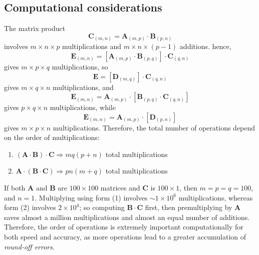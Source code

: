 \subsection{Computational considerations}
The matrix product
\begin{equation}
\mathbf{C}_{(m,n)} = \mathbf{A}_{(m,p)} \cdot \mathbf{B}_{(p,n)}
\end{equation}
involves $m \times n \times p$ multiplications and $m \times n  \times (p -1)$ additions.  hence,
\begin{equation}
\mathbf{E}_{(m,n)} = [ \mathbf{A}_{(m,p)} \cdot \mathbf{B}_{(p,q)}] \cdot \mathbf{C}_{(q,n)}
\end{equation}	 
gives $m \times p \times q$ multiplications, so
\begin{equation}
\mathbf{E} = [\mathbf{D}_{(m,q)}] \cdot \mathbf{C}_{(q,n)}
\end{equation}
gives $m\times q \times n$ multiplications, and
\begin{equation}
\mathbf{E} _{(m,n)} = \mathbf{A}_{(m,p)} \cdot [\mathbf{B}_{(p,q)} \cdot \mathbf{C}_{(q,n)}]
\end{equation}
gives $p\times q \times n$ multiplications, while
\begin{equation}
\mathbf{E}_{(m,n)} = \mathbf{A}_{(m,p)}\cdot [\mathbf{D}_{(p,n)} ]
\end{equation}	
gives $m \times p \times n$ multiplications. Therefore, the total number of operations depend on the order of multiplications:
\begin{enumerate}
\item $\mathbf{(A \cdot B) \cdot C} \Rightarrow mq(p+n)$ total multiplications
\item $\mathbf{A \cdot (B \cdot C)} \Rightarrow pn(m+q)$ total multiplications
\end{enumerate}
If both $\mathbf{A}$ and $\mathbf{B}$ are $100 \times 100$ matrices and $\mathbf{C}$ is $100 \times 1$, then $m = p = q = 100$, and $n 
= 1$. Multiplying using form (1) involves $\sim 1 \times 10^6$ multiplications, whereas form (2) involves $2 \times 
10^4$; so computing $\mathbf{B \cdot C}$ first, then premultiplying by $\mathbf{A}$ saves almost a million multiplications 
and almost an equal number of additions. Therefore, the order of operations is extremely important 
computationally for both speed and accuracy, as more operations lead to a greater accumulation of 
\emph{round-off errors}.

